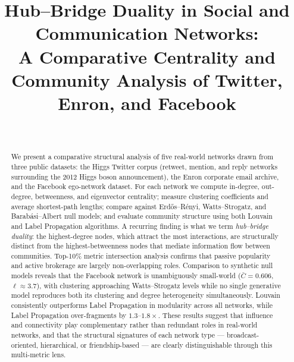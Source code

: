 \documentclass[journal]{IEEEtran}
\begin{document}
\title{Hub--Bridge Duality in Social and Communication Networks:\\ A Comparative Centrality and Community Analysis of Twitter, Enron, and Facebook}
        
    \author{
     \\
    }

\maketitle
\begin{abstract}
We present a comparative structural analysis of five real-world networks
drawn from three public datasets: the Higgs Twitter corpus (retweet,
mention, and reply networks surrounding the 2012 Higgs boson
announcement), the Enron corporate email archive, and the Facebook
ego-network dataset. For each network we compute in-degree, out-degree,
betweenness, and eigenvector centrality; measure clustering coefficients
and average shortest-path lengths; compare against Erd\H{o}s--R\'enyi,
Watts--Strogatz, and Barab\'asi--Albert null models; and evaluate
community structure using both Louvain and Label Propagation algorithms.
A recurring finding is what we term \textit{hub--bridge duality}: the
highest-degree nodes, which attract the most interactions, are
structurally distinct from the highest-betweenness nodes that mediate
information flow between communities. Top-10\% metric intersection
analysis confirms that passive popularity and active brokerage are
largely non-overlapping roles. Comparison to synthetic null models
reveals that the Facebook network is unambiguously small-world
($\bar{C} = 0.606$, $\ell \approx 3.7$), with clustering approaching
Watts--Strogatz levels while no single generative model reproduces both
its clustering and degree heterogeneity simultaneously. Louvain
consistently outperforms Label Propagation in modularity across all
networks, while Label Propagation over-fragments by $1.3$--$1.8\times$.
These results suggest that influence and connectivity play complementary
rather than redundant roles in real-world networks, and that the
structural signatures of each network type — broadcast-oriented,
hierarchical, or friendship-based — are clearly distinguishable through
this multi-metric lens.
\end{abstract}

\captionsetup{font=footnotesize} %


         





\clearpage



\newpage


\end{document}
